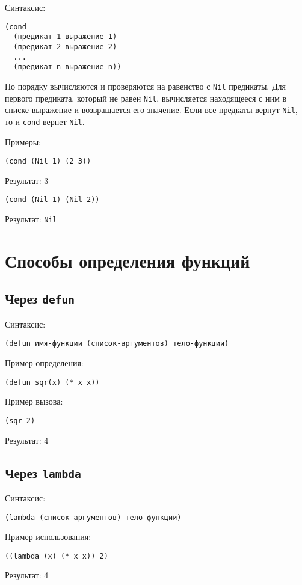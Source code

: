 Синтаксис:
\begin{lstlisting}
(cond 
  (предикат-1 выражение-1)
  (предикат-2 выражение-2)
  ...
  (предикат-n выражение-n))
\end{lstlisting}

По порядку вычисляются и проверяются на равенство с \texttt{Nil} предикаты. Для первого предиката, который не равен \texttt{Nil}, вычисляется находящееся с ним в списке выражение и возвращается его значение. Если все предкаты вернут \texttt{Nil}, то и \texttt{cond} вернет \texttt{Nil}.

Примеры:

\begin{lstlisting}
(cond (Nil 1) (2 3))
\end{lstlisting}
Результат: 3

\begin{lstlisting}
(cond (Nil 1) (Nil 2))
\end{lstlisting}
Результат: \texttt{Nil}

\section{Способы определения функций}

\subsection{Через \texttt{defun}}

Синтаксис:
\begin{lstlisting}
(defun имя-функции (список-аргументов) тело-функции)
\end{lstlisting}

Пример определения:
\begin{lstlisting}
(defun sqr(x) (* x x))
\end{lstlisting}

Пример вызова:
\begin{lstlisting}
(sqr 2)
\end{lstlisting}
Результат: 4

\subsection{Через \texttt{lambda}}

Синтаксис:
\begin{lstlisting}
(lambda (список-аргументов) тело-функции)
\end{lstlisting}

Пример использования:
\begin{lstlisting}
((lambda (x) (* x x)) 2)
\end{lstlisting}
Результат: 4
